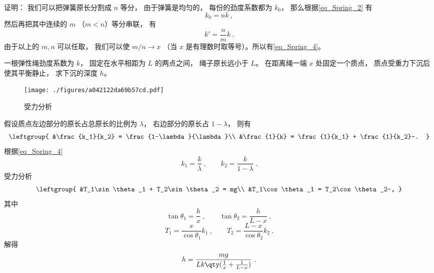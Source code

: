 证明： 我们可以把弹簧原长分割成 $n$ 等分， 由于弹簧是均匀的， 每份的劲度系数都为 $k_0$， 那么根据\autoref{eq_Spring_2} 有
\begin{equation}
k_0 = nk~,
\end{equation}
然后再把其中连续的 $m$ （$m < n$）等分串联， 有
\begin{equation}
k' = \frac{n}{m}k~.
\end{equation}
由于以上的 $m, n$ 可以任取， 我们可以使 $m/n \to x$ （当 $x$ 是有理数时取等号）。所以有\autoref{eq_Spring_4}。

\begin{example}{}\label{ex_Spring_1}
一根弹性绳劲度系数为 $k$， 固定在水平相距为 $L$ 的两点之间， 绳子原长远小于 $L$。 在距离绳一端 $x$ 处固定一个质点， 质点受重力下沉后使其平衡静止， 求下沉的深度 $h$。
\begin{figure}[ht]
\centering
\texttt{[image: ./figures/a042122da69b57cd.pdf]}
\caption{受力分析} \label{fig_Spring_1}
\end{figure}
假设质点左边部分的原长占总原长的比例为 $\lambda$， 右边部分的原长占 $1-\lambda$， 则有
\begin{equation}
\leftgroup{
&\frac{k_1}{k_2} = \frac{1-\lambda}{\lambda}\\
&\frac{1}{k} = \frac{1}{k_1} + \frac{1}{k_2}~.
}
\end{equation}
根据\autoref{eq_Spring_4} 
\begin{equation}
k_1 = \frac{k}{\lambda} ~,\qquad
k_2 = \frac{k}{1-\lambda}~.
\end{equation}
受力分析
\begin{equation}
\leftgroup{
&T_1\sin\theta_1 + T_2\sin\theta_2 = mg\\
&T_1\cos\theta_1 = T_2\cos\theta_2~,
}
\end{equation}
其中
\begin{equation}
\tan\theta_1 = \frac{h}{x}~,
\qquad
\tan\theta_2 = \frac{h}{L-x}~,
\end{equation}
\begin{equation}
T_1 = \frac{x}{\cos\theta_1} k_1 ~,\qquad
T_2 = \frac{L-x}{\cos\theta_2} k_2~.
\end{equation}
解得
\begin{equation}
h = \frac{mg}{Lk\qty(\frac{1}{x} + \frac{1}{L-x})}~.
\end{equation}
\end{example}
